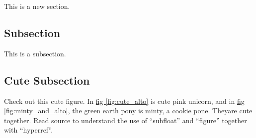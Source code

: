 This is a new section. 
\subsection{Subsection}
This is a subsection. 

\subsection{Cute Subsection}
Check out this cute figure. In \hyperref[fig:cute_alto]{fig \ref*{fig:cute_alto}} is cute pink unicorn, and in \hyperref[fig:minty_and_alto]{fig \ref*{fig:minty_and_alto}}, the green earth pony is minty, a cookie pone. Theyare cute together. Read source to understand the use of ``subfloat'' and ``figure'' together with ``hyperref''. 

\begin{figure}
    \hfil
\end{figure}